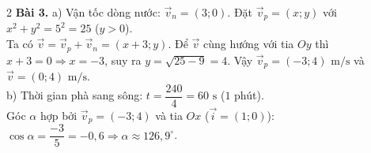 \documentclass[10pt,a4paper]{article}
\begin{document}
\begin{multicols}{2}
\textbf{Bài 3.}
a) Vận tốc dòng nước: $\vec{v}_n = (3; 0)$. Đặt $\vec{v}_p = (x; y)$ với $x^2 + y^2 = 5^2 = 25$ ($y > 0$).\\
Ta có $\vec{v} = \vec{v}_p + \vec{v}_n = (x + 3; y)$. Để $\vec{v}$ cùng hướng với tia $Oy$ thì $x + 3 = 0 \Rightarrow x = -3$, suy ra $y = \sqrt{25 - 9} = 4$. Vậy $\vec{v}_p = (-3; 4)\text{ m/s}$ và $\vec{v} = (0; 4)\text{ m/s}$.\\
b) Thời gian phà sang sông: $t = \dfrac{240}{4} = 60\text{ s}$ ($1$ phút).\\
Góc $\alpha$ hợp bởi $\vec{v}_p = (-3; 4)$ và tia $Ox$ ($\vec{i} = (1; 0)$): $\cos\alpha = \dfrac{-3}{5} = -0{,}6 \Rightarrow \alpha \approx 126{,}9^\circ$.

\end{multicols}
\end{document}

